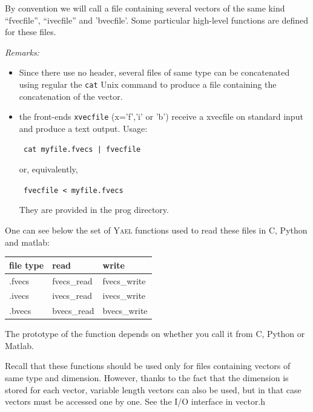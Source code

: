 \documentclass[a4paper,11pt,notitlepage,final,twoside]{report}
\newcommand{\yael}{\textsc{Yael}\xspace}
\newcommand{\tc}[1]{\texttt{#1}}
\newcommand{\code}[1]{\smallskip 

\texttt{#1} 
 \medskip

}
\begin{document}
By convention we will call a file containing several vectors of the same kind ``fvecfile'', ``ivecfile'' 
and 'bvecfile'. 
Some particular high-level functions are defined for these files. 
\bigskip

{\it Remarks:} 
\begin{itemize}
\item Since there use no header, several files of same type can be concatenated using regular the \tc{cat} Unix command to produce a file containing the concatenation of the vector. 
\item the front-ends \tc{xvecfile} (x='f','i' or 'b') receive a xvecfile on standard input and produce a text output. Usage:
\code{
cat myfile.fvecs | fvecfile
}
or, equivalently, 
\code{
fvecfile < myfile.fvecs
}
They are provided in the prog directory. 
\end{itemize}


One can see below the set of \yael functions used to read these files in C, Python 
and matlab:
\begin{center}
\begin{tabular}{lll}
\hline
file type & read        & write \\
\hline
.fvecs    & fvecs\_read & fvecs\_write \\
.ivecs    & ivecs\_read & ivecs\_write \\
.bvecs    & bvecs\_read & bvecs\_write \\
\hline
\end{tabular}
\end{center}

The prototype of the function depends on whether you call it from C, Python or Matlab. 


Recall that these functions should be used only for files containing vectors of same type and dimension. 
However, thanks to the fact that the dimension is stored for each vector, variable length vectors 
can also be used, but in that case vectors must be accessed one by one. 
See the I/O interface in vector.h 


\end{document}
